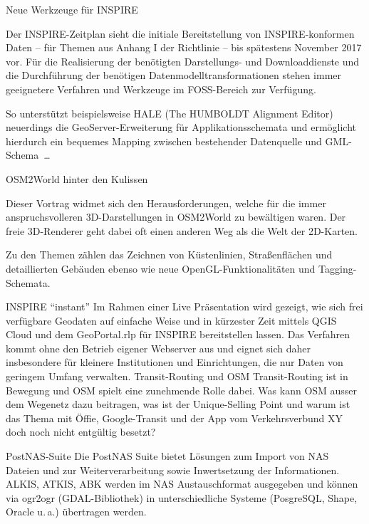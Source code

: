 \newpage
\vspace*{2\baselineskip}

%

%
{Neue Werkzeuge für INSPIRE}%
{}%
{Der INSPIRE-Zeitplan sieht die initiale Bereitstellung von INSPIRE-konformen
Daten -- für Themen aus Anhang I der Richtlinie -- bis spätestens November 2017 vor.
Für die Realisierung der benötigten Darstellungs- und Download\-dienste und die Durchführung
der benötigen Datenmodelltransformationen stehen immer geeignetere Verfahren und Werkzeuge
im FOSS-Bereich zur Verfügung.

So unterstützt beispielsweise HALE (The HUMBOLDT Alignment Editor) neuerdings die GeoServer-Erweiterung
für Applikationsschemata und ermöglicht hierdurch ein bequemes Mapping zwischen
bestehender Datenquelle und GML-Schema~\dots}

\enlargethispage{2\baselineskip}
%
{OSM2World hinter den Kulissen}%
{}%
{Dieser Vortrag widmet sich den Herausforderungen, welche für die immer anspruchsvolleren 3D-Darstellungen in
OSM2World zu bewältigen waren. Der freie 3D-Renderer geht dabei oft einen anderen Weg als die Welt der 2D-Karten.

Zu den Themen zählen das Zeichnen von Küstenlinien, Straßenflächen und detaillierten Gebäuden ebenso wie neue
OpenGL-Funktionalitäten und Tagging-Schemata.}
%
%
{INSPIRE "`instant"'}%
{}%
{Im Rahmen einer Live Präsentation wird gezeigt, wie sich frei verfügbare Geodaten auf einfache Weise und
in kürzester Zeit mittels QGIS Cloud und dem GeoPortal.rlp für INSPIRE bereitstellen lassen.
Das Verfahren kommt ohne den Betrieb eigener Webserver aus und eignet sich daher insbesondere
für kleinere Institutionen und Einrichtungen, die nur Daten von geringem Umfang verwalten.}
%
%
{Transit-Routing und OSM}%
{}%
{Transit-Routing ist in Bewegung und OSM spielt eine zunehmende Rolle dabei.
Was kann OSM ausser dem Wegenetz dazu beitragen, was ist der Unique-Selling Point
und warum ist das Thema mit Öffie, Google-Transit und der App vom Verkehrsverbund XY doch noch nicht entgültig besetzt?}

%
%
{PostNAS-Suite}%
{}%
{Die PostNAS Suite bietet Lösungen zum Import von NAS Dateien und zur Weiterverarbeitung
sowie Inwertsetzung der Informationen. ALKIS, ATKIS, ABK werden im NAS Austauschformat
ausgegeben und können via ogr2ogr (GDAL-Bibliothek) in unterschiedliche Systeme
(PosgreSQL, Shape, Oracle u.\,a.) übertragen werden.
}

